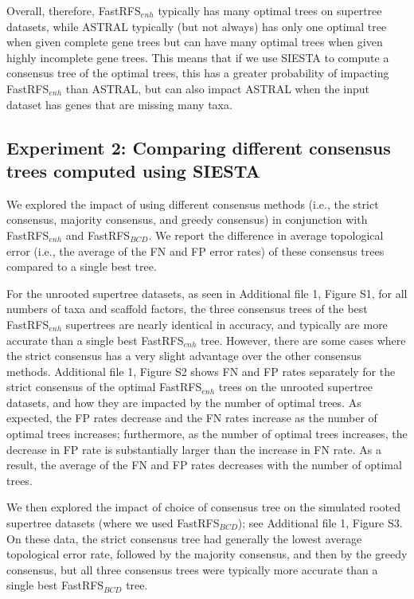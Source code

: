 Overall, therefore, FastRFS$_{enh}$ typically has many optimal trees on supertree datasets, while ASTRAL typically (but not always) has only one  optimal tree when given complete gene trees but can have many optimal trees when given highly incomplete gene trees.
This means that if we use SIESTA  to compute a consensus tree of the optimal trees, this has a greater probability of impacting FastRFS$_{enh}$ than ASTRAL, but can also impact ASTRAL when the input dataset has genes that are missing many taxa.




\subsection{Experiment 2: Comparing different consensus trees computed using SIESTA  }

We explored the impact of using different consensus methods (i.e., the strict consensus, majority consensus, and greedy consensus) in conjunction with FastRFS$_{enh}$ and FastRFS$_{BCD}$. 
We report the difference in average topological error (i.e., the average of the FN and FP error rates) of these consensus trees compared to a single best tree. 

For the unrooted supertree datasets, as seen in  Additional file 1, Figure S1,  for all numbers of taxa and scaffold factors,   the three
consensus trees of the best FastRFS$_{enh}$ supertrees are nearly identical in accuracy, and typically are more accurate than a single best FastRFS$_{enh}$ tree.
However, there are some cases where the strict consensus has a very slight advantage over the other consensus methods.
Additional file 1, Figure S2 shows FN and FP rates separately for the strict consensus of the optimal FastRFS$_{enh}$ trees on the unrooted supertree datasets, and how they are impacted by the number of optimal trees. 
As expected, the FP rates decrease and the FN rates increase  as the number of optimal trees increases; furthermore, 
as the number of optimal trees increases, the  decrease in FP rate is substantially larger than the increase in FN rate.
As a result, the average of the FN and FP rates decreases with the number of optimal trees. 

We then explored the impact of choice of consensus tree on the simulated rooted supertree datasets (where we used FastRFS$_{BCD}$); see Additional file 1, Figure S3.
On these data, the strict consensus tree had generally the lowest average topological error rate, followed by the majority consensus, and then by the greedy consensus, but all three consensus trees were typically more accurate than a single best FastRFS$_{BCD}$ tree. 


